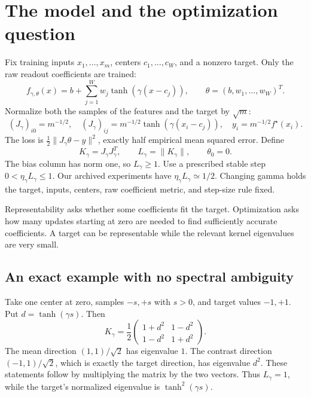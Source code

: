 \documentclass[11pt]{article}
\theoremstyle{definition}
\begin{document}
\section{The model and the optimization question}
Fix training inputs $x_1,\ldots,x_m$, centers $c_1,\ldots,c_W$, and a nonzero
target. Only the raw readout coefficients are trained:
\begin{equation*}
 f_{\gamma,\theta}(x)=b+\sum_{j=1}^Ww_j\tanh(\gamma(x-c_j)),\qquad
 \theta=(b,w_1,\ldots,w_W)^T.
\end{equation*}
Normalize both the samples of the features and the target by $\sqrt m$:
\begin{equation*}
 (J_\gamma)_{i0}=m^{-1/2},\quad
 (J_\gamma)_{ij}=m^{-1/2}\tanh(\gamma(x_i-c_j)),\quad
 y_i=m^{-1/2}f^\star(x_i).
\end{equation*}
The loss is $\frac12\|J_\gamma\theta-y\|^2$, exactly half empirical mean
squared error. Define
\begin{equation*}
 K_\gamma=J_\gamma J_\gamma^T,\qquad L_\gamma=\|K_\gamma\|,\qquad\theta_0=0.
\end{equation*}
The bias column has norm one, so $L_\gamma\ge1$. Use a prescribed stable step
$0<\eta_\gamma L_\gamma\le1$. Our archived experiments have
$\eta_\gamma L_\gamma\simeq1/2$. Changing gamma holds the target, inputs,
centers, raw coefficient metric, and step-size rule fixed.

Representability asks whether some coefficients fit the target. Optimization
asks how many updates starting at zero are needed to find sufficiently accurate
coefficients. A target can be representable while the relevant kernel
eigenvalues are very small.

\subsection*{An exact example with no spectral ambiguity}
Take one center at zero, samples $-s,+s$ with $s>0$, and target values $-1,+1$.
Put $d=\tanh(\gamma s)$. Then
\begin{equation*}
 K_\gamma=\frac12\begin{pmatrix}1+d^2&1-d^2\\1-d^2&1+d^2\end{pmatrix}.
\end{equation*}
The mean direction $(1,1)/\sqrt2$ has eigenvalue $1$. The contrast direction
$(-1,1)/\sqrt2$, which is exactly the target direction, has eigenvalue $d^2$.
These statements follow by multiplying the matrix by the two vectors. Thus
$L_\gamma=1$, while the target's normalized eigenvalue is
$\tanh^2(\gamma s)$.
\end{document}
